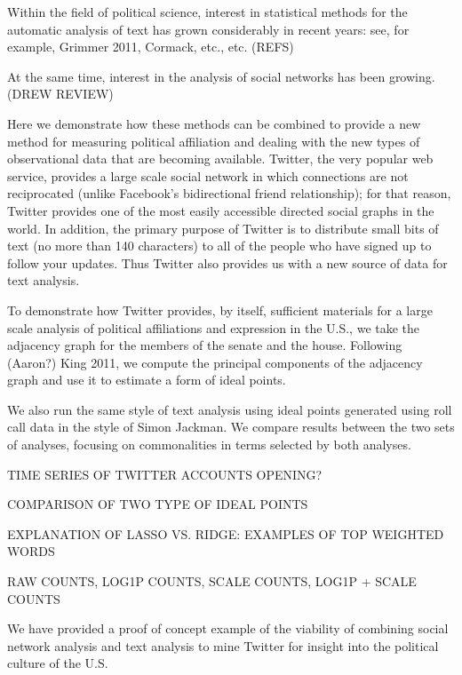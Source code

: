 Within the field of political science, interest in statistical methods for the automatic analysis of text has grown considerably in recent years: see, for example, Grimmer 2011, Cormack, etc., etc. (REFS)

At the same time, interest in the analysis of social networks has been growing. (DREW REVIEW)

Here we demonstrate how these methods can be combined to provide a new method for measuring political affiliation and dealing with the new types of observational data that are becoming available. Twitter, the very popular web service, provides a large scale social network in which connections are not reciprocated (unlike Facebook's bidirectional friend relationship); for that reason, Twitter provides one of the most easily accessible directed social graphs in the world. In addition, the primary purpose of Twitter is to distribute small bits of text (no more than 140 characters) to all of the people who have signed up to follow your updates. Thus Twitter also provides us with a new source of data for text analysis.

To demonstrate how Twitter provides, by itself, sufficient materials for a large scale analysis of political affiliations and expression in the U.S., we take the adjacency graph for the members of the senate and the house. Following (Aaron?) King 2011, we compute the principal components of the adjacency graph and use it to estimate a form of ideal points. 

We also run the same style of text analysis using ideal points generated using roll call data in the style of Simon Jackman. We compare results between the two sets of analyses, focusing on commonalities in terms selected by both analyses.

TIME SERIES OF TWITTER ACCOUNTS OPENING?

COMPARISON OF TWO TYPE OF IDEAL POINTS

EXPLANATION OF LASSO VS. RIDGE: EXAMPLES OF TOP WEIGHTED WORDS

RAW COUNTS, LOG1P COUNTS, SCALE COUNTS, LOG1P + SCALE COUNTS

We have provided a proof of concept example of the viability of combining social network analysis and text analysis to mine Twitter for insight into the political culture of the U.S.
